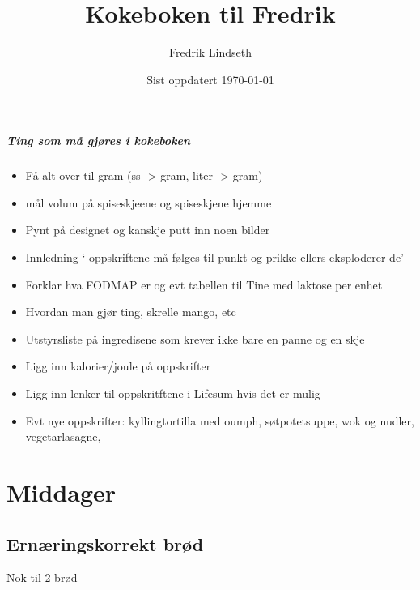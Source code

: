 \documentclass[12pt,a4paper]{book}
\title{Kokeboken til Fredrik}
\author{Fredrik Lindseth}
\date{Sist oppdatert \today}
\begin{document}
\maketitle




\setcounter{page}{5}

\tableofcontents
\clearpage


\paragraph{Ting som må gjøres i kokeboken}
\begin{itemize}[noitemsep]
  \item Få alt over til gram (ss -> gram, liter -> gram)
  \item mål volum på spiseskjeene og spiseskjene hjemme
  \item Pynt på designet og kanskje putt inn noen bilder
  \item Innledning ` oppskriftene må følges til punkt og prikke ellers eksploderer de'
  \item Forklar hva FODMAP er og evt tabellen til Tine med laktose per enhet
  \item Hvordan man gjør ting, skrelle mango, etc
  \item Utstyrsliste på ingredisene som krever ikke bare en panne og en skje
  \item Ligg inn kalorier/joule på oppskrifter
  \item Ligg inn lenker til oppskritftene i Lifesum hvis det er mulig
  \item Evt nye oppskrifter: kyllingtortilla med oumph, søtpotetsuppe, wok og nudler, vegetarlasagne,
\end{itemize}
 \clearpage

\thispagestyle{empty}
\null\newpage

\setcounter{page}{1}

\chapter{Middager}
\clearpage{}\section{Ernæringskorrekt brød}
Nok til 2 brød
\end{document}
